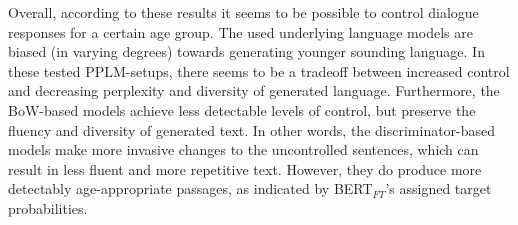 Overall, according to these results it seems to be possible to control dialogue responses for a certain age group. The used underlying language models are biased (in varying degrees) towards generating younger sounding language. In these tested PPLM-setups, there seems to be a tradeoff between increased control and decreasing perplexity and diversity of generated language. Furthermore, the BoW-based models achieve less detectable levels of control, but preserve the fluency and diversity of generated text. In other words, the discriminator-based models make more invasive changes to the uncontrolled sentences, which can result in less fluent and more repetitive text. However, they do produce more detectably age-appropriate passages, as indicated by BERT$_{FT}$'s assigned target probabilities.

